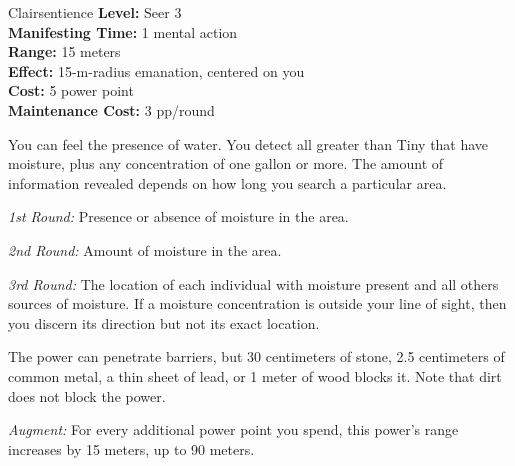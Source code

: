 {Clairsentience}
{
	\textbf{Level:}
	Seer 3\\
	\textbf{Manifesting Time:}
	1 mental action\\
	\textbf{Range:}
	15 meters\\
	\textbf{Effect:}
	15-m-radius emanation, centered on you\\
	\textbf{Cost:}
	5 power point\\
	\textbf{Maintenance Cost:}
	3 pp/round\\
}
{
	You can feel the presence of water. You detect all greater than Tiny that have moisture, plus any concentration of one gallon or more. The amount of information revealed depends on how long you search a particular area.

	\textit{1st Round:} Presence or absence of moisture in the area.

	\textit{2nd Round:} Amount of moisture in the area.

	\textit{3rd Round:} The location of each individual with moisture present and all others sources of moisture. If a moisture concentration is outside your line of sight, then you discern its direction but not its exact location.

	The power can penetrate barriers, but 30 centimeters of stone, 2.5 centimeters of common metal, a thin sheet of lead, or 1 meter of wood blocks it. Note that dirt does not block the power.

	\textit{Augment:} For every additional power point you spend, this power's range increases by 15 meters, up to 90 meters.
}